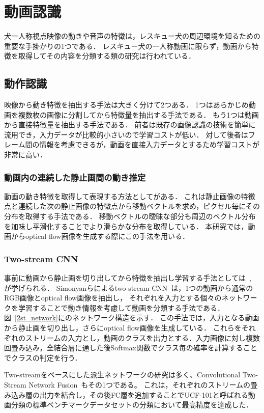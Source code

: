 \section{動画認識}
犬一人称視点映像の動きや音声の特徴は，レスキュー犬の周辺環境を知るための重要な手掛かりの1つである．
レスキュー犬の一人称動画に限らず，動画から特徴を取得してその内容を分類する類の研究は行われている．
\subsection{動作認識}
映像から動き特徴を抽出する手法は大きく分けて2つある．
1つはあらかじめ動画を複数枚の画像に分割してから特徴量を抽出する手法である．
もう1つは動画から直接特徴量を抽出する手法である．
前者は既存の画像認識の技術を簡単に流用でき，入力データが比較的小さいので学習コストが低い．
対して後者はフレーム間の情報を考慮できるが，動画を直接入力データとするため学習コストが非常に高い．


\subsubsection{動画内の連続した静止画間の動き推定}
動画の動き特徴を取得して表現する方法として\cite{Zach2007optical}がある．
これは静止画像の特徴点と連続した次の静止画像の特徴点から移動ベクトルを求め，ピクセル毎にその分布を取得する手法である．
移動ベクトルの曖昧な部分も周辺のベクトル分布を加味し平滑化することでより滑らかな分布を取得している．
本研究では，動画からoptical flow画像を生成する際にこの手法を用いる．


\subsubsection{Two-stream CNN}
事前に動画から静止画を切り出してから特徴を抽出し学習する手法としては~\cite{simonyan2014two}, \cite{wang2015towards}が挙げられる．
Simonyanらによるtwo-stream CNN~\cite{simonyan2014two}は，1つの動画から通常のRGB画像とoptical flow画像を抽出し，
それぞれを入力とする個々のネットワークを学習することで動き情報を考慮して動画を分類する手法である．
図~\ref{2st_network}に\cite{simonyan2014two}のネットワーク構造を示す．
この手法では，入力となる動画から静止画を切り出し，さらにoptical flow画像を生成している．
これらをそれぞれのストリームの入力とし，動画のクラスを出力とする．入力画像に対し複数回畳み込み，全結合層に通した後Softmax関数でクラス毎の確率を計算することでクラスの判定を行う．

Two-streamをベースにした派生ネットワークの研究は多く、Convolutional Two-Stream Network Fusion~\cite{a}もその1つである。
これは，それぞれのストリームの畳み込み層の出力を結合し，その後FC層を追加することでUCF-101と呼ばれる動画分類の標準ベンチマークデータセットの分類において最高精度を達成した．

